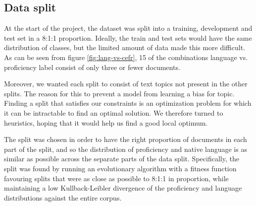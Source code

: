 \subsection{Data split}

At the start of the project, the dataset was split into a training,
development and test set in a 8:1:1 proportion. Ideally, the train and test
sets would have the same distribution of classes, but the limited amount of
data made this more difficult. As can be seen from figure
\ref{fig:lang-vs-cefr}, 15 of the combinations language vs. proficiency label
consist of only three or fewer documents.

Moreover, we wanted each split to consist of text topics not present in the
other splits. The reason for this to prevent a model from learning a bias for
topic. Finding a split that satisfies our constraints is an optimization
problem for which it can be intractable to find an optimal solution. We
therefore turned to heuristics, hoping that it would help us find a good
local optimum.
 
The split was chosen in order to have the right proportion of documents in
each part of the split, and so the distribution of proficiency and native
language is as similar as possible across the separate parts of the data
split. Specifically, the split was found by running an evolutionary algorithm
with a fitness function favouring splits that were as close as possible to
8:1:1 in proportion, while maintaining a low Kullback-Leibler divergence of
the proficiency and language distributions against the entire corpus.

